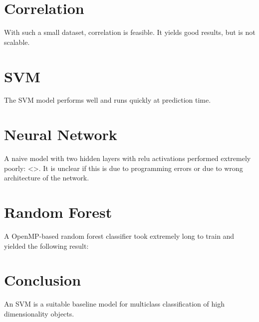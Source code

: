\documentclass{article}
\begin{document}
\section{Correlation}
With such a small dataset, correlation is feasible.
It yields good results, but is not scalable.


\section{SVM}
The SVM model performs well and runs quickly at prediction time.

\section{Neural Network}
A naive model with two hidden layers with relu activations performed extremely poorly: <>.
It is unclear if this is due to programming errors or due to wrong architecture of the network.


\section{Random Forest}
A OpenMP-based random forest classifier took extremely long to train and yielded the following result:


\section{Conclusion}
An SVM is a suitable baseline model for multiclass classification of high dimensionality objects.


%
\printbibliography
\end{document}
